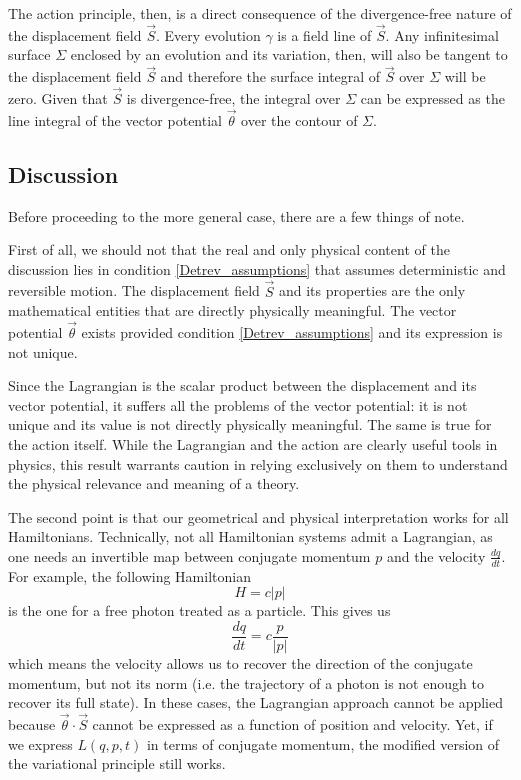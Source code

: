 \documentclass[10pt,twocolumn, nofootinbib]{revtex4-2}
\begin{document}
The action principle, then, is a direct consequence of the divergence-free nature of the displacement field $\vec{S}$. Every evolution $\gamma$ is a field line of $\vec{S}$. Any infinitesimal surface $\Sigma$ enclosed by an evolution and its variation, then, will also be tangent to the displacement field $\vec{S}$ and therefore the surface integral of $\vec{S}$ over $\Sigma$ will be zero. Given that $\vec{S}$ is divergence-free, the integral over $\Sigma$ can be expressed as the line integral of the vector potential $\vec{\theta}$ over the contour of $\Sigma$.

\subsection{Discussion}

Before proceeding to the more general case, there are a few things of note.

First of all, we should not that the real and only physical content of the discussion lies in condition \ref{Detrev_assumptions} that assumes deterministic and reversible motion. The displacement field $\vec{S}$ and its properties are the only mathematical entities that are directly physically meaningful. The vector potential $\vec{\theta}$ exists provided condition \ref{Detrev_assumptions} and its expression is not unique.

Since the Lagrangian is the scalar product between the displacement and its vector potential, it suffers all the problems of the vector potential: it is not unique and its value is not directly physically meaningful. The same is true for the action itself. While the Lagrangian and the action are clearly useful tools in physics, this result warrants caution in relying exclusively on them to understand the physical relevance and meaning of a theory.

The second point is that our geometrical and physical interpretation works for all Hamiltonians. Technically, not all Hamiltonian systems admit a Lagrangian, as one needs an invertible map between conjugate momentum $p$ and the velocity $\frac{dq}{dt}$. For example, the following Hamiltonian
\begin{equation}
	H = c |p|
\end{equation}
is the one for a free photon treated as a particle. This gives us
\begin{equation}
	\frac{dq}{dt}= c \frac{p}{|p|}
\end{equation}
which means the velocity allows us to recover the direction of the conjugate momentum, but not its norm (i.e. the trajectory of a photon is not enough to recover its full state). In these cases, the Lagrangian approach cannot be applied because $\vec{\theta} \cdot \vec{S}$ cannot be expressed as a function of position and velocity. Yet, if we express $L(q,p,t)$ in terms of conjugate momentum, the modified version of the variational principle still works.
\end{document}
